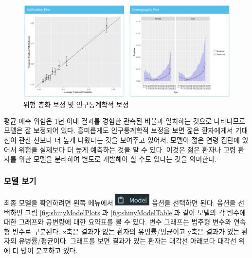 \documentclass[10.5pt]{book}
\theoremstyle{definition}
\theoremstyle{definition}
\theoremstyle{definition}
\theoremstyle{remark}
\begin{document}
\begin{figure}

{\centering \includegraphics[width=1\linewidth]{images/PatientLevelPrediction/shiny/shinyPerformanceCal} 

}

\caption{위험 층화 보정 및 인구통계학적 보정}\label{fig:shinyPerformanceCal}
\end{figure}

평균 예측 위험은 1년 이내 결과를 경험한 관측된 비율과 일치하는 것으로
나타나므로 모델은 잘 보정되어 있다. 흥미롭게도 인구통계학적 보정을 보면
젊은 환자에게서 기대 선이 관찰 선보다 더 높게 나왔다는 것을 보여주고
있어서, 모델이 젊은 연령 집단에 있어서 위험을 실제보다 더 높게 예측하는
것을 알 수 있다. 이것은 젊은 환자나 고령 환자를 위한 모델을 분리하여
별도로 개발해야 할 수도 있다는 것을 의미한다.

\subsubsection*{모델 보기}\label{-}

최종 모델을 확인하려면 왼쪽 메뉴에서
\includegraphics{images/PatientLevelPrediction/modelButton.png} 옵션을
선택하면 된다. 옵션을 선택하면 그림 \ref{fig:shinyModelPlots}과
\ref{fig:shinyModelTable}과 같이 모델의 각 변수에 대한 그래프와 공변량에
대한 요약표를 볼 수 있다. 변수 그래프는 범주형 변수와 연속형 변수로
구분된다. x축은 결과가 없는 환자의 유병률/평균이고 y축은 결과가 있는
환자의 유병률/평균이다. 그래프를 보면 결과가 있는 환자는 대각선 아래보다
대각선 위에 더 많이 분포하고 있다.
\end{document}
